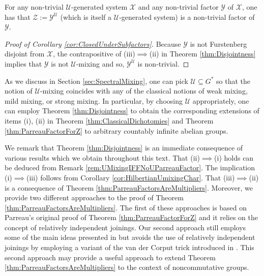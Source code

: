\documentclass[graybox]{svmult}
\theoremstyle{definition}
\begin{document}
\begin{corollary}\label{cor:ClosedUnderSubfactors}
    For any non-trivial $\mathcal U$-generated system $\mathcal X$ and any non-trivial factor $\mathcal Y$ of $\mathcal X$, one has that $\mathcal Z:=\mathcal Y^\mathcal U$ (which is itself a $\mathcal U$-generated system) is  a non-trivial factor of $\mathcal Y$.
\end{corollary}
\begin{proof}[Proof of Corollary \ref{cor:ClosedUnderSubfactors}]
Because $\mathcal Y$ is not Furstenberg disjoint from $\mathcal X$, the contrapositive of (iii)$\implies$(ii) in Theorem \ref{thm:Disjointness} implies that $\mathcal Y$ is not $\mathcal U$-mixing and so,  $\mathcal Y^\mathcal U$ is non-trivial.
\end{proof}
As we discuss in Section \ref{sec:SpectralMixing}, one can pick $\mathcal U\subseteq G^*$ so that the notion of $\mathcal U$-mixing coincides with any of the classical notions of weak mixing, mild mixing, or strong mixing. In particular, by choosing $\mathcal U$ appropriately, one can employ Theorem \ref{thm:Disjointness} to obtain the corresponding extensions of items (i), (ii) in Theorem \ref{thm:ClassicalDichotomies}  and Theorem \ref{thm:ParreauFactorForZ} to arbitrary countably infinite abelian groups.

  We remark that Theorem \ref{thm:Disjointness} is an immediate consequence of various results which we obtain throughout this text. That (ii)$\implies$(i) holds can be deduced from  Remark \ref{rem:UMixingIFFNoUParreauFactor}. The implication (i)$\implies$(iii) follows from Corollary \ref{cor:HilbertianUmixingChar}. That (iii)$\implies$(ii) is a consequence of Theorem \ref{thm:ParreauFactorsAreMultipliers}. Moreover,  we provide two different approaches to the proof of  Theorem \ref{thm:ParreauFactorsAreMultipliers}. The first of these approaches is based on Parreau's original proof of  Theorem \ref{thm:ParreauFactorForZ} and it relies on the concept of relatively independent joinings. Our second approach still employs some of the main ideas presented in \cite{ParreauFactor} but avoids the use of relatively independent joinings by employing a variant of the van der Corput trick introduced in \cite{StronglyMixingPET}.
  This second approach may provide a useful approach to extend Theorem \ref{thm:ParreauFactorsAreMultipliers} to the context of noncommutative groups.
\end{document}
